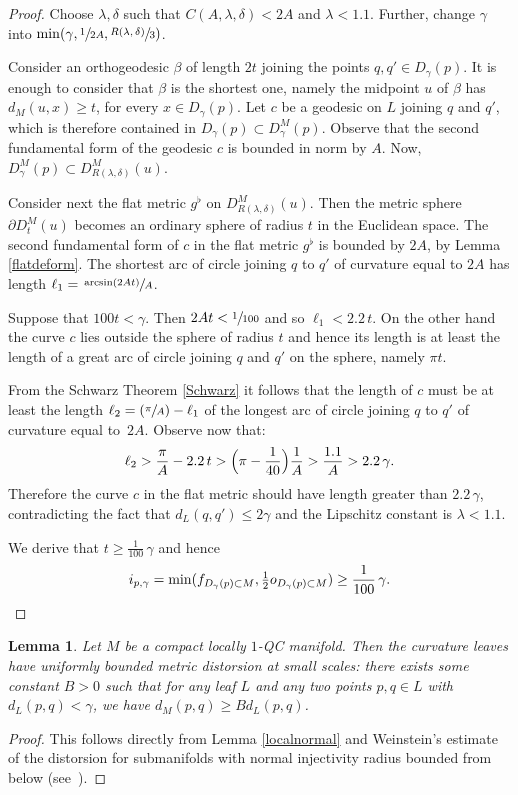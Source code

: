 \documentclass[JEP,XML,SOM,Unicode]{cedram}
\newcommand{\Psfrac}[2]{(\sfrac{#1}{#2})}
\newtheorem{lemma}[theorem]{Lemma}
\theoremstyle{definition}
\theoremstyle{remark}
\numberwithin{equation}{section}
\begin{document}
\begin{proof}
Choose $\lambda, \delta$ such that $C(A,\lambda,\delta) < 2A$ and
$\lambda <1.1$. Further, change $\gamma$ into $\min(\gamma, \sfrac{1}{2A}, \sfrac{R(\lambda, \delta)}{3})$.

Consider an orthogeodesic $\beta$ of length $2t$ joining the points $q,q'\in D_{\gamma}(p)$.
It is enough to consider that $\beta$ is the shortest one, namely the midpoint $u$ of $\beta$
has $d_M(u,x) \geq t$, for every $x\in D_{\gamma}(p)$.
Let $c$ be a geodesic on $L$ joining $q$ and $q'$, which is therefore contained in $D_{\gamma}(p)
\subset D^M_{\gamma}(p)$. Observe that the second fundamental form of the geodesic $c$ is bounded in norm by $A$.
Now, $D^M_{\gamma}(p)\subset D^M_{R(\lambda,\delta)}(u)$.

Consider next the flat metric $g^{\flat}$ on $D^M_{R(\lambda,\delta)}(u)$. Then the metric sphere
$\partial D^M_{t}(u)$ becomes an ordinary sphere of radius $t$ in the Euclidean space.
The second fundamental form of $c$ in the flat metric $g^{\flat}$ is bounded by $2A$, by Lemma \ref{flatdeform}.
The shortest arc of circle joining $q$ to $q'$ of curvature equal to $2A$ has length
$\ell_1=\sfrac{\arcsin(2At)}{A}$.

Suppose that $100t < \gamma$. Then $2At< \sfrac{1}{100}$ and so $\ell_1 < 2.2\, t$.
On the other hand the curve $c$ lies outside the sphere of radius $t$ and hence its length is
at least the length of a great arc of circle joining $q$ and $q'$ on the sphere, namely $\pi t$.

From the Schwarz Theorem \ref{Schwarz} it follows that the length of $c$ must be at least
the length $\ell_2=\Psfrac{\pi}{A}-\ell_1$ of the longest arc of circle joining $q$ to $q'$ of curvature equal to~$2A$.
Observe now that:
\[ \ell_2> \frac{\pi}{A}-2.2\, t > \Bigl(\pi -\frac{1}{40}\Bigr)\frac{1}{A} > \frac{1.1}{A} > 2.2\, \gamma.\]
Therefore the curve $c$ in the flat metric should have length greater than $2.2\, \gamma$, contradicting the fact that
$d_L(q,q') \leq 2\gamma$ and the Lipschitz constant is $\lambda < 1.1$.

We derive that $t \geq \frac{1}{100}\,\gamma$ and hence
\[ i_{p,\gamma}= \min(f_{D_{\gamma}(p)\subset M}, \tfrac12 o_{D_{\gamma}(p)\subset M}) \geq \frac{1}{100}\, \gamma.\qedhere\]
\end{proof}

\begin{lemma}\label{Weinstein}
Let $M$ be a compact locally $1$-QC manifold. Then the curvature leaves have uniformly bounded metric distorsion at small scales:
there exists some constant $B>0$ such that for any leaf $L$ and any two points $p,q\in L$ with
$d_L(p,q) < \gamma$, we have $d_M(p,q)\geq B d_L(p,q)$.
\end{lemma}
\begin{proof}
This follows directly from Lemma \ref{localnormal} and Weinstein's estimate of the distorsion for submanifolds
with normal injectivity radius bounded from below (see~\cite[Cor.\,3.5]{Wein}).
\end{proof}
\end{document}
